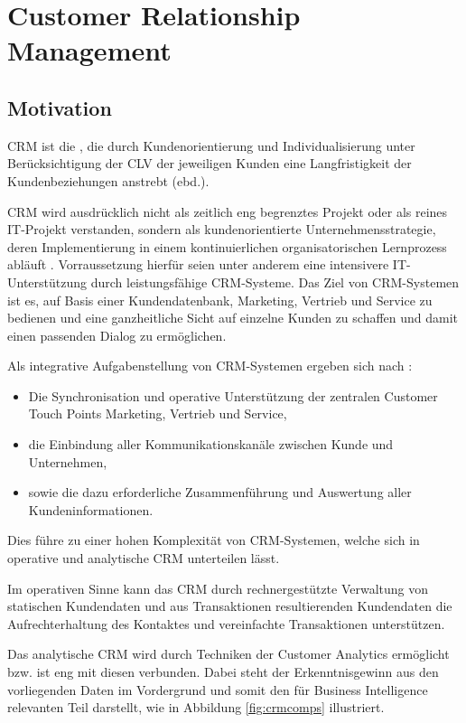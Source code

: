 \section{Customer Relationship Management}
\label{sec:crm}

\subsection{Motivation}

CRM ist die  \cite{crm_gabler2020}, die durch Kundenorientierung und Individualisierung unter Berücksichtigung der CLV der jeweiligen Kunden eine Langfristigkeit der Kundenbeziehungen anstrebt (ebd.).

CRM wird ausdrücklich nicht als zeitlich eng begrenztes Projekt oder als reines IT-Projekt verstanden, sondern als kundenorientierte Unternehmensstrategie, deren Implementierung in einem kontinuierlichen organisatorischen Lernprozess abläuft \cite[S. 47]{grundcrm}.
Vorraussetzung hierfür seien unter anderem eine intensivere IT-Unterstützung durch leistungsfähige CRM-Systeme.
Das Ziel von CRM-Systemen ist es, auf Basis einer Kundendatenbank, Marketing, Vertrieb und Service zu bedienen und eine ganzheitliche Sicht auf einzelne Kunden zu schaffen und damit einen passenden Dialog zu ermöglichen.

Als integrative Aufgabenstellung von CRM-Systemen ergeben sich nach \cite[S. 47]{grundcrm}:
\begin{itemize}
  \item Die Synchronisation und operative Unterstützung der zentralen Customer Touch Points Marketing, Vertrieb und Service,
  \item die Einbindung aller Kommunikationskanäle zwischen Kunde und Unternehmen,
  \item sowie die dazu erforderliche Zusammenführung und Auswertung aller Kundeninformationen.
\end{itemize}

Dies führe zu einer hohen Komplexität von CRM-Systemen, welche sich in operative und analytische CRM unterteilen lässt. \cite{kumar2018}

Im operativen Sinne kann das CRM durch rechnergestützte Verwaltung von statischen Kundendaten und aus Transaktionen resultierenden Kundendaten die Aufrechterhaltung des Kontaktes und vereinfachte Transaktionen unterstützen.

Das analytische CRM wird durch Techniken der Customer Analytics ermöglicht bzw. ist eng mit diesen verbunden. Dabei steht der Erkenntnisgewinn aus den vorliegenden Daten im Vordergrund \cite{kumar2018} und somit den für Business Intelligence relevanten Teil darstellt, wie in Abbildung \ref{fig:crmcomps} illustriert.

